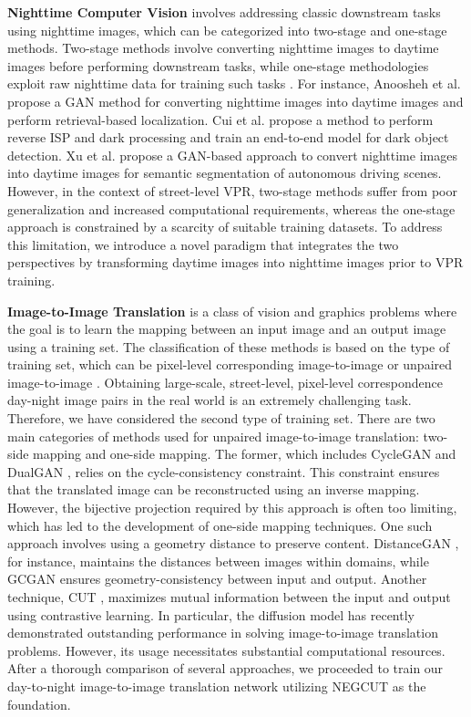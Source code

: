 \documentclass[10pt,twocolumn,letterpaper]{article}
\begin{document}
\noindent \textbf{Nighttime Computer Vision} involves addressing classic downstream tasks using nighttime images, which can be categorized into two-stage and one-stage methods. Two-stage methods \cite{todaygan, gan_ss} involve converting nighttime images to daytime images before performing downstream tasks, while one-stage methodologies exploit raw nighttime data for training such tasks \cite{risp, vpr_bench}. For instance, Anoosheh et al. \cite{todaygan} propose a GAN method for converting nighttime images into daytime images and perform retrieval-based localization. Cui et al. \cite{risp} propose a method to perform reverse ISP and dark processing and train an end-to-end model for dark object detection. Xu et al. \cite{gan_ss} propose a GAN-based approach to convert nighttime images into daytime images for semantic segmentation of autonomous driving scenes. However, in the context of street-level VPR, two-stage methods suffer from poor generalization and increased computational requirements, whereas the one-stage approach is constrained by a scarcity of suitable training datasets. To address this limitation, we introduce a novel paradigm that integrates the two perspectives by transforming daytime images into nighttime images prior to VPR training.

\noindent \textbf{Image-to-Image Translation} is a class of vision and graphics problems where the goal is to learn the mapping between an input image and an output image using a training set. The classification of these methods is based on the type of training set, which can be pixel-level corresponding image-to-image or unpaired image-to-image \cite{unpaired, dualgan}. Obtaining large-scale, street-level, pixel-level correspondence day-night image pairs in the real world is an extremely challenging task. Therefore, we have considered the second type of training set. There are two main categories of methods used for unpaired image-to-image translation: two-side mapping and one-side mapping. The former, which includes CycleGAN \cite{unpaired} and DualGAN \cite{dualgan}, relies on the cycle-consistency constraint. This constraint ensures that the translated image can be reconstructed using an inverse mapping. However, the bijective projection required by this approach is often too limiting, which has led to the development of one-side mapping techniques. One such approach involves using a geometry distance to preserve content. DistanceGAN \cite{distance}, for instance, maintains the distances between images within domains, while GCGAN \cite{gcgan} ensures geometry-consistency between input and output. Another technique, CUT \cite{cut}, maximizes mutual information between the input and output using contrastive learning. In particular, the diffusion model \cite{egsde} has recently demonstrated outstanding performance in solving image-to-image translation problems. However, its usage necessitates substantial computational resources. After a thorough comparison of several approaches, we proceeded to train our day-to-night image-to-image translation network utilizing NEGCUT \cite{negcut} as the foundation.
\end{document}
